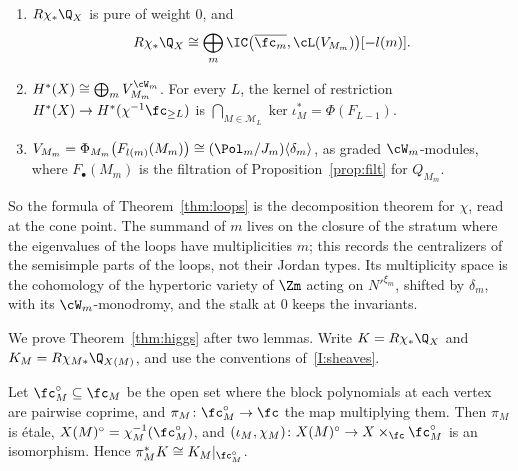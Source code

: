 \documentclass[11pt]{amsart}
\begin{document}
\begin{theorem}\label{thm:higgs}
\begin{enumerate}[leftmargin=2em]
\item $R\chi_*\Q_X$ is pure of weight $0$, and
\[
 R\chi_*\Q_X\cong\bigoplus_m\IC\big(\overline{\fc_m},\cL(V_{M_m})\big)[-l(m)].
\]
\item $H^*(X)\cong\bigoplus_mV_{M_m}^{\cW_m}$.  For every $L$, the kernel
of restriction $H^*(X)\to H^*(\chi^{-1}\fc_{\ge L})$ is
$\bigcap_{M\in\mathcal M_L}\ker\iota_M^*=\Phi(F_{L-1})$.
\item $V_{M_m}=\Phi_{M_m}\big(F_{l(m)}(M_m)\big)\cong(\Pol_m/J_m)\langle\delta_m\rangle$, as
graded $\cW_m$-modules, where $F_\bullet(M_m)$ is the filtration of
Proposition~\ref{prop:filt} for $Q_{M_m}$.
\end{enumerate}
\end{theorem}

So the formula of Theorem~\ref{thm:loops} is the decomposition theorem for
$\chi$, read at the cone point.  The summand of $m$ lives on the closure of
the stratum where the eigenvalues of the loops have multiplicities $m$; this
records the centralizers of the semisimple parts of the loops, not their
Jordan types.  Its multiplicity space is the cohomology of the hypertoric variety of
$\Zm$ acting on $N'^{\xi_m}$, shifted by $\delta_m$, with its
$\cW_m$-monodromy, and the stalk at $0$ keeps the invariants.

We prove Theorem~\ref{thm:higgs} after two lemmas.  Write $K=R\chi_*\Q_X$ and
$K_M=R\chi_{M*}\Q_{X(M)}$, and use the conventions of~\ref{I:sheaves}.

\begin{lemma}\label{lem:localmodel}
Let $\fc^\circ_M\subseteq\fc_M$ be the open set where the block polynomials at
each vertex are pairwise coprime, and $\pi_M\colon\fc^\circ_M\to\fc$ the map
multiplying them.  Then $\pi_M$ is \'etale, $X(M)^\circ=\chi_M^{-1}(\fc^\circ_M)$,
and $(\iota_M,\chi_M)\colon X(M)^\circ\to X\times_\fc\fc^\circ_M$ is an
isomorphism.  Hence $\pi_M^*K\cong K_M|_{\fc^\circ_M}$.
\end{lemma}
\end{document}
